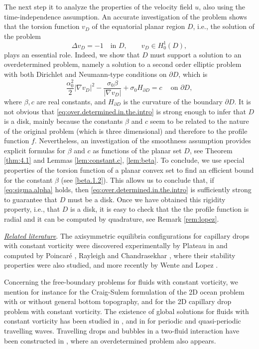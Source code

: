 \documentclass[10pt,reqno,a4paper]{article}
\numberwithin{equation}{section}
\theoremstyle{plain}
\theoremstyle{definition}
\newcommand{\pa}{\partial}
\begin{document}
The next step it to analyze the properties of the velocity field $u$, 
also using the time-independence assumption.
An accurate investigation of the problem shows that the torsion function $v_D$ 
of the equatorial planar region $D$, i.e., the solution of the problem 
\[ 
\Delta v_D = -1 \quad \text{in } D, \qquad 
v_D \in H^1_0(D),
\] 
plays an essential role. 
Indeed, we show that $D$ must support a solution to an overdetermined problem, 
namely a solution to a second order elliptic problem with both Dirichlet 
and Neumann-type conditions on $\pa D$, which is 
\begin{equation} \label{eq:over.determined.in.the.intro}
\frac{\alpha_0^2}{2}  | \nabla v_D|^{2}  
- \frac{ \sigma_0 \beta }{ | \nabla v_D| }  
+ \sigma_0 H_{\pa D}
= c 
\quad \ \text{on } \pa D,
\end{equation}
where $\beta,c$ are real constants, 
and $H_{\pa D}$ is the curvature of the boundary $\pa D$. 
It is not obvious that \eqref{eq:over.determined.in.the.intro} 
is strong enough to infer that $D$ is a disk, 
mainly because the constants $\beta$ and $c$ 
seem to be related to the nature of the original problem 
(which is three dimensional) and therefore to the profile function $f$. 
Nevertheless, an investigation of the smoothness assumption 
provides explicit formulas for $\beta$ and $c$ 
as functions of the planar set $D$, 
see Theorem \ref{thm:4.1} and Lemmas \ref{lem:constant.c}, \ref{lem:beta}.  
To conclude, we use special properties of the torsion function of a planar convex set 
to find an efficient bound for the constant $\beta$ (see \eqref{beta.1.2}).
This allows us to conclude that, if \eqref{eq:sigma.alpha} holds, 
then \eqref{eq:over.determined.in.the.intro} is sufficiently strong 
to guarantee that $D$ must be a disk. 
Once we have obtained this rigidity property, i.e., that $D$ is a disk, 
it is easy to check that the the profile function is radial and it can be 
computed by quadrature, see Remark \ref{rem:lopez}. 

\medskip

\underline{{\it Related literature}}. The axisymmetric equilibria configurations for capillary drops 
with constant vorticity were discovered experimentally by Plateau in \cite{Plateau} 
and computed by Poincaré \cite{Poincaré}, Rayleigh \cite{Rayleigh} 
and Chandrasekhar \cite{Chandrasekhar}, where their stability properties were also studied,
and more recently by Wente \cite{W} and Lopez \cite{Lo}. 

Concerning the free-boundary problems for fluids with constant vorticity, 
we mention for instance \cite{Wahlen, Wahlen.2007, Pasquali} 
for the Craig-Sulem formulation of the 2D ocean problem 
with or without general bottom topography, 
and \cite{LaS} for the 2D capillary drop problem with constant vorticity. 
The existence of global solutions for fluids with constant vorticity has been studied in 
\cite{Constantin.Strauss, Constantin.K.2009, Wahlen.2, Fan.Gao.2021}, 
and in \cite{BBMM, BFM} for periodic and quasi-periodic travelling waves. 
Travelling drops and bubbles in a two-fluid interaction have been constructed in \cite{MNS}, 
where an overdetermined problem also appears. 
\end{document}

